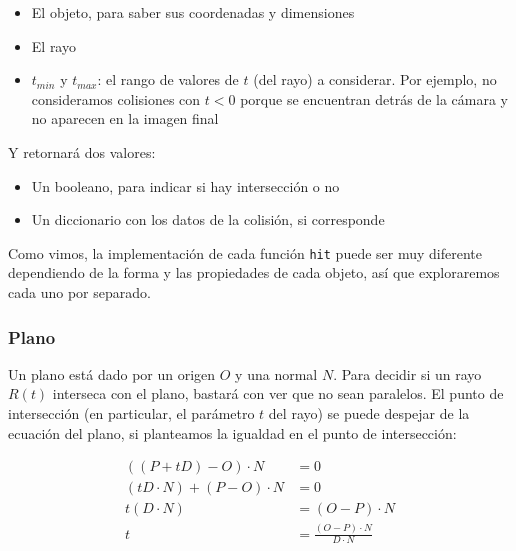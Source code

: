 \begin{itemize}
  \item El objeto, para saber sus coordenadas y dimensiones
  \item El rayo
  \item $t_{min}$ y $t_{max}$: el rango de valores de $t$ (del rayo) a
        considerar. Por ejemplo, no consideramos colisiones con $t < 0$ porque
        se encuentran detrás de la cámara y no aparecen en la imagen final
\end{itemize}

Y retornará dos valores:

\begin{itemize}
  \item Un booleano, para indicar si hay intersección o no
  \item Un diccionario con los datos de la colisión, si corresponde
\end{itemize}

Como vimos, la implementación de cada función \texttt{hit} puede ser muy
diferente dependiendo de la forma y las propiedades de cada objeto, así que
exploraremos cada uno por separado.

\subsubsection{Plano}

Un plano está dado por un origen $O$ y una normal $N$. Para decidir si un rayo
$R(t)$ interseca con el plano, bastará con ver que no sean paralelos. El punto
de intersección (en particular, el parámetro $t$ del rayo) se puede despejar de
la ecuación del plano, si planteamos la igualdad en el punto de intersección:

\begin{align*}
  ((P + tD) - O) \cdot N         & = 0                                 \\
  (tD \cdot N) + (P - O) \cdot N & = 0                                 \\
  t(D \cdot N)                   & = (O - P) \cdot N                   \\
  t                              & = \frac{(O - P) \cdot N}{D \cdot N} \\
\end{align*}

